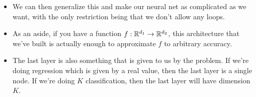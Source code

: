 \begin{itemize}

	\item We can then generalize this and make our neural net as complicated as we
		want, with the only restriction being that we don't allow any loops. 
	\item As an aside, if you have a function \( f: \mathbb R^{d_1} \to \mathbb R^{d_2} \), this
		architecture that we've built is actually enough to approximate \( f \) to
		arbitrary accuracy. 
	\item The last layer is also something that is given to us by the problem. If
		we're doing regression which is given by a real value, then the last layer is
		a single node. If we're doing \( K \) classification, then the last layer
		will have dimension \( K \). 
\end{itemize}

